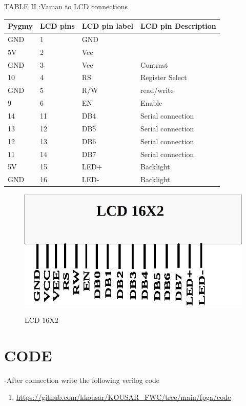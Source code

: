 \documentclass[journal,12pt,twocolumn]{IEEEtran}
\begin{document}
\begin{center}
    TABLE II :Vaman to LCD connections
\end{center}
 \begin{tabular}{ |p{1.5cm}|p{1.5cm}|p{1.5cm}|p{1.5cm}| }
 \hline
 \setlength{\tabcolsep}{3pt}
Pygmy & LCD pins & LCD pin label & LCD pin Description\\
\hline
 GND & 1& GND & \\
 \hline
 5V & 2 & Vcc &\\
 \hline
 GND & 3 & Vee & Contrast\\
 \hline
 10 & 4 & RS & Register Select\\
 \hline
 GND & 5 & R/W & read/write\\
 \hline
 9 & 6 & EN &Enable\\
 \hline
 14 & 11 & DB4 & Serial connection\\
 \hline
 13 & 12 & DB5 & Serial connection\\
 \hline
 12 & 13 & DB6 & Serial connection\\
 \hline
 11 & 14 & DB7 & Serial connection\\
 \hline
 5V & 15 & LED+ & Backlight\\
 \hline
 GND & 16 & LED- & Backlight\\
 \hline
\end{tabular}



\begin{figure}[h!]
\vspace{7cm}
\centering
\includegraphics[scale=0.5]{figs/lcd.png}   \\
\centering
\caption{LCD 16X2}
\end{figure}


\newpage \section*{CODE}
-After connection write the following verilog code
\begin{enumerate}
\item[]\hspace{-2cm}\url{https://github.com/kkousar/KOUSAR_FWC/tree/main/fpga/code}
\end{enumerate}



   
\end{document}
